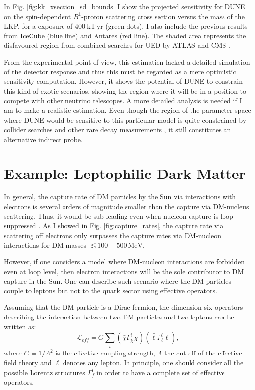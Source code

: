 In Fig. \ref{fig:kk_xsection_sd_bounds} I show the projected sensitivity for DUNE on the spin-dependent $B^{1}$-proton scattering cross section versus the mass of the LKP, for a exposure of $400 \ \mathrm{kT}  \ \mathrm{yr}$ (green dots). I also include the previous results from IceCube \cite{Bernadich2019} (blue line) and Antares \cite{Zornoza2012} (red line). The shaded area represents the disfavoured region from combined searches for UED by ATLAS and CMS \cite{Deutschmann2017}.

From the experimental point of view, this estimation lacked a detailed simulation of the detector response and thus this must be regarded as a mere optimistic sensitivity computation. However, it shows the potential of DUNE to constrain this kind of exotic scenarios, showing the region where it will be in a position to compete with other neutrino telescopes. A more detailed analysis is needed if I am to make a realistic estimation. Even though the region of the parameter space where DUNE would be sensitive to this particular model is quite constrained by collider searches \cite{Deutschmann2017} and other rare decay measurements \cite{Haisch2007, Freitas2008}, it still constitutes an alternative indirect probe.

\section{Example: Leptophilic Dark Matter}
\label{sec:dm_analysis_leptophilic_dm}

In general, the capture rate of DM particles by the Sun via interactions with electrons is several orders of magnitude smaller than the capture via DM-nucleus scattering. Thus, it would be sub-leading even when nucleon capture is loop suppressed \cite{Kopp2009}. As I showed in Fig. \ref{fig:capture_rates}, the capture rate via scattering off electrons only surpasses the capture rates via DM-nucleon interactions for DM masses $\lesssim 100 - 500 \ \mathrm{MeV}$.

However, if one considers a model where DM-nucleon interactions are forbidden even at loop level, then electron interactions will be the sole contributor to DM capture in the Sun. One can describe such scenario where the DM particles couple to leptons but not to the quark sector using effective operators.

Assuming that the DM particle is a Dirac fermion, the dimension six operators describing the interaction between two DM particles and two leptons can be written as:
\begin{equation}\label{7.1}
	\mathcal{L}_{eff} = G \sum_{i} \left(\bar{\chi} \Gamma^{i}_{\chi} \chi\right)\left(\bar{\ell} \Gamma^{i}_{\ell} \ell\right),
\end{equation}
where $G=1/\Lambda^{2}$ is the effective coupling strength, $\Lambda$ the cut-off of the effective field theory and $\ell$ denotes any lepton. In principle, one should consider all the possible Lorentz structures $\Gamma^{i}_{f}$ in order to have a complete set of effective operators.

